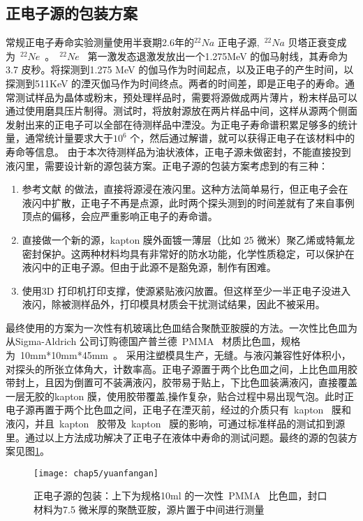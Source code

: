 \subsection{正电子源的包装方案}
常规正电子寿命实验测量使用半衰期2.6年的$^{22}Na$ 正电子源,~$^{22}Na$ 贝塔正衰变成为~$^{22}Ne$~。~$^{22}Ne$~ 第一激发态退激发放出一个1.275MeV 的伽马射线，其寿命为3.7 皮秒。将探测到1.275 MeV 的伽马作为时间起点，以及正电子的产生时间，以探测到511KeV 的湮灭伽马作为时间终点。两者的时间差，即是正电子的寿命。通常测试样品为晶体或粉末，预处理样品时，需要将源做成两片薄片，粉末样品可以通过使用磨具压片制得。测试时，将放射源放在两片样品中间，这样从源两个侧面发射出来的正电子可以全部在待测样品中湮没。为正电子寿命谱积累足够多的统计量，通常统计量要求大于$10^{6}$ 个，然后通过解谱，就可以获得正电子在该材料中的寿命等信息。
由于本次待测样品为油状液体，正电子源未做密封，不能直接投到液闪里，需要设计新的源包装方案。正电子源的包装方案考虑到的有三种：
\begin{enumerate}
\item 参考文献\citep{franco2011positronium} 的做法，直接将源浸在液闪里。这种方法简单易行，但正电子会在液闪中扩散，正电子不再是点源，此时两个探头测到的时间差就有了来自事例顶点的偏移，会应严重影响正电子的寿命谱。
\item 直接做一个新的源，kapton 膜外面镀一薄层（比如 25 微米）聚乙烯或特氟龙密封保护。这两种材料均具有非常好的防水功能，化学性质稳定，可以保护在液闪中的正电子源。但由于此源不是豁免源，制作有困难。
\item 使用3D 打印机打印支撑，使源紧贴液闪放置。但这样至少一半正电子没进入液闪，除被测样品外，打印模具材质会干扰测试结果，因此不被采用。
\end{enumerate}
最终使用的方案为一次性有机玻璃比色皿结合聚酰亚胺膜的方法。一次性比色皿为从Sigma-Aldrich 公司订购德国产普兰德~PMMA~ 材质比色皿，规格为~10mm*10mm*45mm~。 采用注塑模具生产，无缝。与液闪兼容性好体积小，对探头的所张立体角大，计数率高。正电子源置于两个比色皿之间，上比色皿用胶带封上，且因为倒置可不装满液闪，胶带易于贴上，下比色皿装满液闪，直接覆盖一层无胶的kapton 膜，使用胶带覆盖,操作复杂，贴合过程中易出现气泡。此时正电子源再置于两个比色皿之间，正电子在湮灭前，经过的介质只有~kapton~ 膜和液闪，并且~kapton~ 胶带及~kapton~ 膜的影响，可通过标准样品的测试扣到源里。通过以上方法成功解决了正电子在液体中寿命的测试问题。最终的源的包装方案见图\ref{fig:p53}。
\begin{figure}[!htbp]
  \centering
  \texttt{[image: chap5/yuanfangan]}
  \caption{正电子源的包装：上下为规格10ml 的一次性~PMMA~ 比色皿，封口材料为7.5 微米厚的聚酰亚胺，源片置于中间进行测量}
  \label{fig:p53}
\end{figure}

